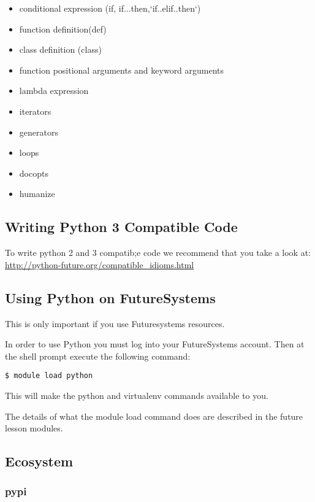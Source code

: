 \begin{itemize}

\item
  conditional expression (if, if...then,`if..elif..then`)
\item
  function definition(def)
\item
  class definition (class)
\item
  function positional arguments and keyword arguments
\item
  lambda expression
\item
  iterators
\item
  generators
\item
  loops
\item
  docopts
\item
  humanize
\end{itemize}

\subsection{Writing Python 3 Compatible
Code}\label{writing-python-3-compatible-code}

To write python 2 and 3 compatib;e code we recommend that you take a
look at: \url{http://python-future.org/compatible_idioms.html}

\subsection{Using Python on
FutureSystems}\label{using-python-on-futuresystems}

This is only important if you use Futuresystems resources.

In order to use Python you must log into your FutureSystems account.
Then at the shell prompt execute the following command:

\begin{verbatim}
$ module load python
\end{verbatim}

This will make the python and virtualenv commands available to you.

The details of what the module load command does are described in the
future lesson modules.

\subsection{Ecosystem}\label{ecosystem}

\subsubsection{pypi}\label{pypi}

